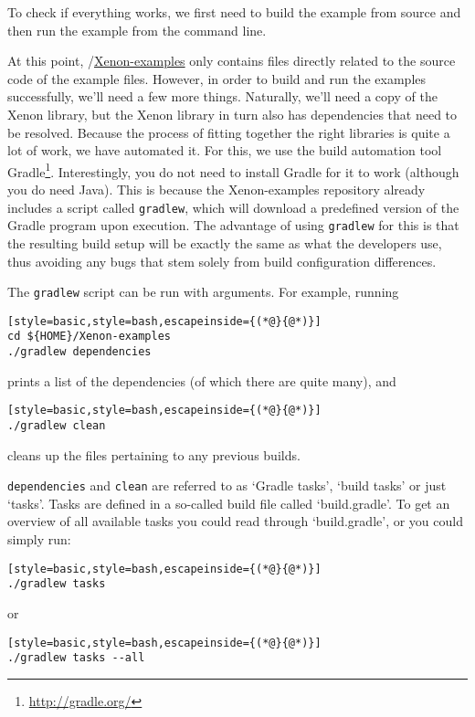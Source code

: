 To check if everything works, we first need to build the example from source and then run the example from the command line.

At this point, \mytilde/\url{Xenon-examples} only contains files directly related to the source code of the example files. However, in order to build and run the examples successfully, we'll need a few more things. Naturally, we'll need a copy of the Xenon library, but the Xenon library in turn also has dependencies that need to be resolved. Because the process of fitting together the right libraries is quite a lot of work, we have automated it. For this, we use the build automation tool Gradle\footnote{\url{http://gradle.org/}}. Interestingly, you do not need to install Gradle for it to work (although you do need Java). This is because the Xenon-examples repository already includes a script called \texttt{gradlew}, which will download a predefined version of the Gradle program upon execution. The advantage of using \texttt{gradlew} for this is that the resulting build setup will be exactly the same as what the developers use, thus avoiding any bugs that stem solely from build configuration differences.

The \texttt{gradlew} script can be run with arguments. For example, running
\begin{lstlisting}[style=basic,style=bash,escapeinside={(*@}{@*)}]
cd ${HOME}/Xenon-examples
./gradlew dependencies
\end{lstlisting} %
prints a list of the dependencies (of which there are quite many), and

\begin{lstlisting}[style=basic,style=bash,escapeinside={(*@}{@*)}]
./gradlew clean
\end{lstlisting} %
cleans up the files pertaining to any previous builds.

\texttt{dependencies} and \texttt{clean} are referred to as `Gradle tasks', `build tasks' or just `tasks'. Tasks are defined in a so-called build file called `build.gradle'. To get an overview of all available tasks you could read through `build.gradle', or you could simply run:
\begin{lstlisting}[style=basic,style=bash,escapeinside={(*@}{@*)}]
./gradlew tasks
\end{lstlisting} %

or

\begin{lstlisting}[style=basic,style=bash,escapeinside={(*@}{@*)}]
./gradlew tasks --all
\end{lstlisting} %

